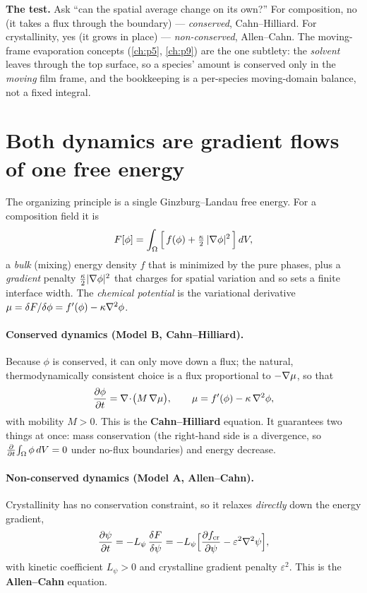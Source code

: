 \begin{keybox}
\textbf{The test.} Ask ``can the spatial average change on its own?'' For
composition, no (it takes a flux through the boundary) --- \emph{conserved},
Cahn--Hilliard. For crystallinity, yes (it grows in place) ---
\emph{non-conserved}, Allen--Cahn. The moving-frame evaporation concepts
(\ref{ch:p5}, \ref{ch:p9}) are the one subtlety: the \emph{solvent} leaves
through the top surface, so a species' amount is conserved only in the
\emph{moving} film frame, and the bookkeeping is a per-species moving-domain
balance, not a fixed integral.
\end{keybox}

\section{Both dynamics are gradient flows of one free energy}

The organizing principle is a single Ginzburg--Landau free energy. For a
composition field it is
%
\begin{equation}
  F[\phi] = \int_\Omega\Big[\, f(\phi) + \tfrac{\kappa}{2}\,|\nabla\phi|^2 \,\Big]\,dV ,
  \label{eq:p0F}
\end{equation}
%
a \emph{bulk} (mixing) energy density $f$ that is minimized by the pure
phases, plus a \emph{gradient} penalty $\tfrac{\kappa}{2}|\nabla\phi|^2$ that
charges for spatial variation and so sets a finite interface width. The
\emph{chemical potential} is the variational derivative
$\mu=\delta F/\delta\phi = f'(\phi)-\kappa\nabla^2\phi$.

\paragraph{Conserved dynamics (Model B, Cahn--Hilliard).}
Because $\phi$ is conserved, it can only move down a flux; the natural,
thermodynamically consistent choice is a flux proportional to
$-\nabla\mu$, so that
%
\begin{equation}
  \frac{\partial \phi}{\partial t} = \nabla\!\cdot\!\big(M\,\nabla\mu\big),
  \qquad \mu = f'(\phi) - \kappa\,\nabla^2\phi ,
  \label{eq:p0ch}
\end{equation}
%
with mobility $M>0$. This is the \textbf{Cahn--Hilliard} equation. It
guarantees two things at once: mass conservation (the right-hand side is a
divergence, so $\frac{\partial }{\partial t}\!\int_\Omega\phi\,dV=0$ under no-flux boundaries) and
energy decrease.

\paragraph{Non-conserved dynamics (Model A, Allen--Cahn).}
Crystallinity has no conservation constraint, so it relaxes
\emph{directly} down the energy gradient,
%
\begin{equation}
  \frac{\partial \psi}{\partial t} = -L_\psi\,\frac{\delta F}{\delta\psi}
              = -L_\psi\Big[\frac{\partial f_{\text{cr}}}{\partial \psi} - \varepsilon^2\nabla^2\psi\Big],
  \label{eq:p0ac}
\end{equation}
%
with kinetic coefficient $L_\psi>0$ and crystalline gradient penalty
$\varepsilon^2$. This is the \textbf{Allen--Cahn} equation.

